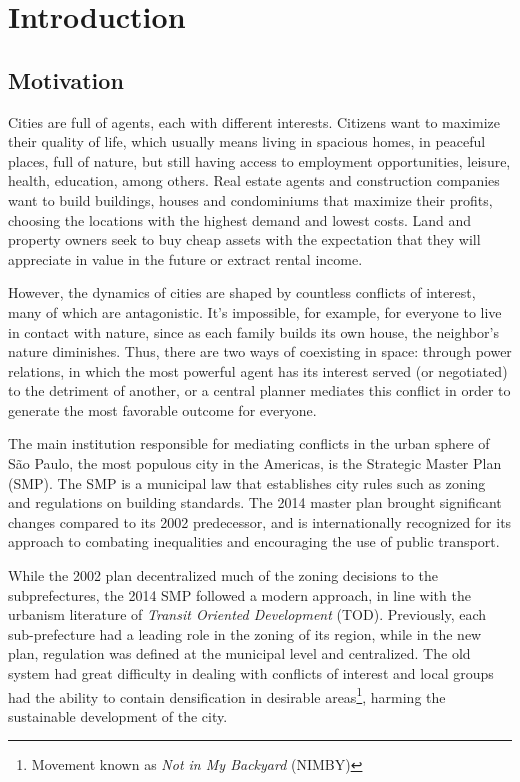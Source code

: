 \chapter{Introduction}

\section{Motivation}
\label{sec:motivation}

Cities are full of agents, each with different interests. Citizens want to maximize their quality of life, which usually means living in spacious homes, in peaceful places, full of nature, but still having access to employment opportunities, leisure, health, education, among others. Real estate agents and construction companies want to build buildings, houses and condominiums that maximize their profits, choosing the locations with the highest demand and lowest costs. Land and property owners seek to buy cheap assets with the expectation that they will appreciate in value in the future or extract rental income.

However, the dynamics of cities are shaped by countless conflicts of interest, many of which are antagonistic. It's impossible, for example, for everyone to live in contact with nature, since as each family builds its own house, the neighbor's nature diminishes. Thus, there are two ways of coexisting in space: through power relations, in which the most powerful agent has its interest served (or negotiated) to the detriment of another, or a central planner mediates this conflict in order to generate the most favorable outcome for everyone.

The main institution responsible for mediating conflicts in the urban sphere of São Paulo, the most populous city in the Americas, is the Strategic Master Plan (SMP). The SMP is a municipal law that establishes city rules such as zoning and regulations on building standards. The 2014 master plan brought significant changes compared to its 2002 predecessor, and is internationally recognized for its approach to combating inequalities and encouraging the use of public transport.

While the 2002 plan decentralized much of the zoning decisions to the subprefectures, the 2014 SMP followed a modern approach, in line with the urbanism literature of \textit{Transit Oriented Development} (TOD). Previously, each sub-prefecture had a leading role in the zoning of its region, while in the new plan, regulation was defined at the municipal level and centralized. The old system had great difficulty in dealing with conflicts of interest and local groups had the ability to contain densification in desirable areas\footnote{Movement known as \textit{Not in My Backyard} (NIMBY)}, harming the sustainable development of the city.

